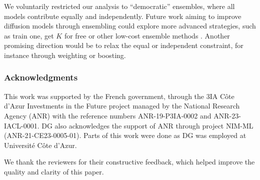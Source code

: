 \documentclass[10pt]{article} %
\newcommand{\engquote}[1]{``#1''}
\begin{document}
We voluntarily restricted our analysis to \engquote{democratic} ensembles, where all models contribute equally and independently. Future work aiming to improve diffusion models through ensembling could explore more advanced strategies, such as train one, get $K$ for free or other low-cost ensemble methods \citep{rame2021mixmo,huang2017snapshot,ha2016hypernetworks,havasi2021training,wasay2020mothernetsrapiddeepensemble}. Another promising direction would be to relax the equal or independent constraint, for instance through weighting or boosting.

\subsubsection*{Acknowledgments}

This work was supported by the French government, through the 3IA Côte d’Azur Investments in the Future project managed by the National Research Agency (ANR) with the reference numbers ANR-19-P3IA-0002 and ANR-23-IACL-0001. DG also acknowledges the support of ANR through project NIM-ML (ANR-21-CE23-0005-01). Parts of this work were done as DG was employed at Université Côte d’Azur.

We thank the reviewers for their constructive feedback, which helped improve the quality and clarity of this paper.








\newpage
\appendix
\end{document}
